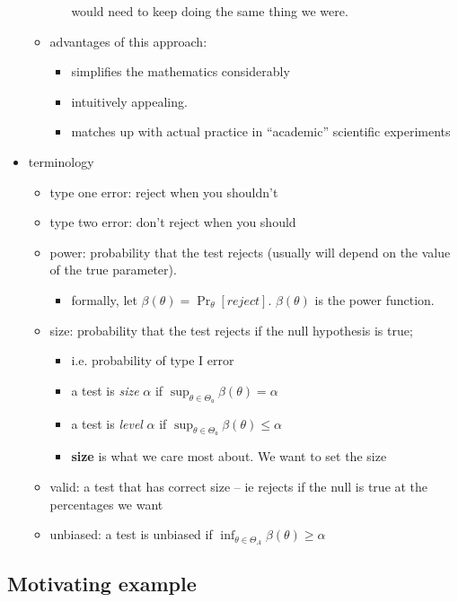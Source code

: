 \begin{itemize}
\begin{itemize}
\begin{itemize}
           would need to keep doing the same thing we were.
\end{itemize}
\item advantages of this approach:
\begin{itemize}
\item simplifies the mathematics considerably
\item intuitively appealing.
\item matches up with actual practice in ``academic'' scientific experiments
\end{itemize}
\end{itemize}
\item terminology
\begin{itemize}
\item type one error: reject when you shouldn't
\item type two error: don't reject when you should
\item power: probability that the test rejects (usually will depend
         on the value of the true parameter).
\begin{itemize}
\item formally, let $β(θ) = \Pr_θ[reject]$.  $β(θ)$ is the power function.
\end{itemize}
\item size: probability that the test rejects if the null hypothesis is true;
\begin{itemize}
\item i.e. probability of type I error
\item a test is \emph{size} $α$ if $\sup_{θ ∈ Θ₀} β(θ) = α$
\item a test is \emph{level} $α$ if $\sup_{θ ∈ Θ₀} β(θ) ≤ α$
\item \textbf{size} is what we care most about.  We want to set the size
\end{itemize}
\item valid: a test that has correct size -- ie rejects if the null
         is true at the percentages we want
\item unbiased: a test is unbiased if $\inf_{θ ∈ Θ_A} β(θ) ≥ α$
\end{itemize}
\end{itemize}

\subsection{Motivating example}

